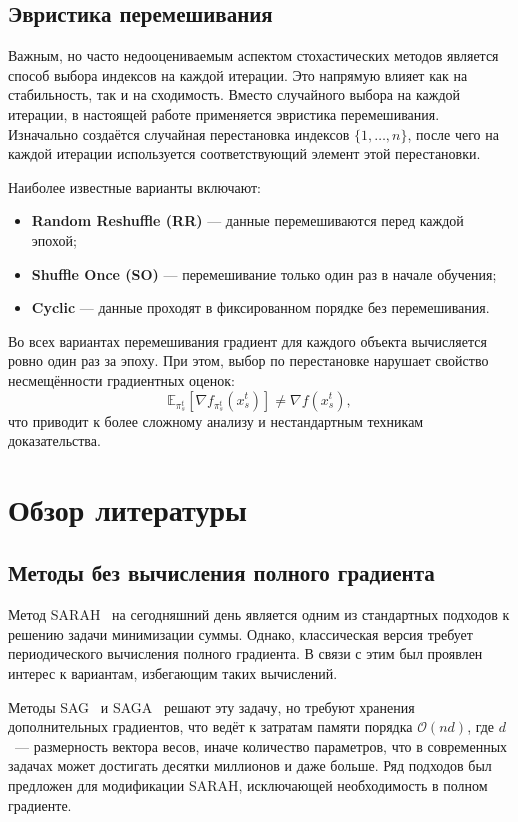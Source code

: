 \subsection*{Эвристика перемешивания}

Важным, но часто недооцениваемым аспектом стохастических методов является способ выбора индексов на каждой итерации. Это напрямую влияет как на стабильность, так и на сходимость. Вместо случайного выбора на каждой итерации, в настоящей работе применяется эвристика перемешивания. Изначально создаётся случайная перестановка индексов \(\{1,\ldots,n\}\), после чего на каждой итерации используется соответствующий элемент этой перестановки.

Наиболее известные варианты включают:
\begin{itemize}
    \item \textbf{Random Reshuffle (RR)} — данные перемешиваются перед каждой эпохой;
    \item \textbf{Shuffle Once (SO)} — перемешивание только один раз в начале обучения;
    \item \textbf{Cyclic} — данные проходят в фиксированном порядке без перемешивания.
\end{itemize}

Во всех вариантах перемешивания градиент для каждого объекта вычисляется ровно один раз за эпоху. При этом, выбор по перестановке нарушает свойство несмещённости градиентных оценок:
\[
\mathbb{E}_{\pi_s^t} \left[\nabla f_{\pi_s^t}(x_s^t)\right] \neq \nabla f(x_s^t),
\]
что приводит к более сложному анализу и нестандартным техникам доказательства.

\clearpage
\section{Обзор литературы}

\subsection*{Методы без вычисления полного градиента}

Метод \textsc{SARAH}~\cite{nguyen2017sarah} на сегодняшний день является одним из стандартных подходов к решению задачи минимизации суммы. Однако, классическая версия требует периодического вычисления полного градиента. В связи с этим был проявлен интерес к вариантам, избегающим таких вычислений.

Методы \textsc{SAG}~\cite{schmidt2017minimizing} и \textsc{SAGA}~\cite{defazio2014saga} решают эту задачу, но требуют хранения дополнительных градиентов, что ведёт к затратам памяти порядка \(\mathcal{O}(nd)\), где $d$~--- размерность вектора весов, иначе количество параметров, что в современных задачах может достигать десятки миллионов и даже больше. Ряд подходов был предложен для модификации \textsc{SARAH}, исключающей необходимость в полном градиенте.

